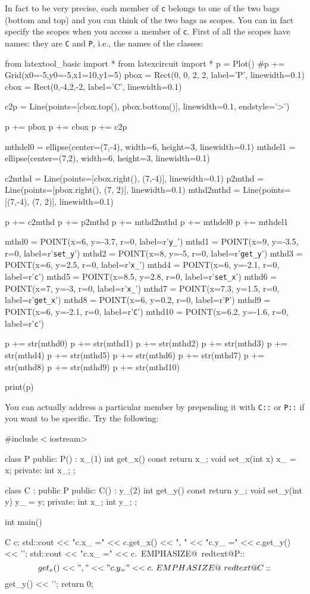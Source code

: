 In fact to be very precise, each member of \verb!c! belongs to one of
the two bags (bottom and top) and you can think of the two bags as
scopes. You can in fact specify the scopes when you access a member of
\verb!c!. First of all the scopes have names: they are \verb!C! and
\verb!P!, i.e., the names of the classes:
\begin{python}
from latextool_basic import *
from latexcircuit import *
p = Plot()
#p += Grid(x0=-5,y0=-5,x1=10,y1=5)
pbox = Rect(0, 0, 2, 2, label='P', linewidth=0.1)
cbox = Rect(0,-4,2,-2, label='C', linewidth=0.1)

c2p = Line(points=[cbox.top(), pbox.bottom()], linewidth=0.1, endstyle='>')

p += pbox
p += cbox
p += c2p

mthdel0 = ellipse(center=(7,-4), width=6, height=3, linewidth=0.1)
mthdel1 = ellipse(center=(7,2), width=6, height=3, linewidth=0.1)

c2mthd = Line(points=[cbox.right(), (7,-4)], linewidth=0.1)
p2mthd = Line(points=[pbox.right(), (7, 2)], linewidth=0.1)
mthd2mthd = Line(points=[(7,-4), (7, 2)], linewidth=0.1)

p += c2mthd
p += p2mthd
p += mthd2mthd
p += mthdel0
p += mthdel1

mthd0 = POINT(x=6, y=-3.7, r=0, label=r'\verb!y_!')
mthd1 = POINT(x=9, y=-3.5, r=0, label=r'\verb!set_y!')
mthd2 = POINT(x=8, y=-5, r=0, label=r'\verb!get_y!')
mthd3 = POINT(x=6, y=2.5, r=0, label=r'\verb!x_!')
mthd4 = POINT(x=6, y=-2.1, r=0, label=r'\large\verb!c!')
mthd5 = POINT(x=8.5, y=2.8, r=0, label=r'\verb!set_x!')
mthd6 = POINT(x=7, y=-3, r=0, label=r'\verb!x_!')
mthd7 = POINT(x=7.3, y=1.5, r=0, label=r'\verb!get_x!')
mthd8 = POINT(x=6, y=0.2, r=0, label=r'\large\verb!P!')
mthd9 = POINT(x=6, y=-2.1, r=0, label=r'\large\verb!C!')
mthd10 = POINT(x=6.2, y=-1.6, r=0, label=r'\large\verb!c!')

p += str(mthd0)
p += str(mthd1)
p += str(mthd2)
p += str(mthd3)
p += str(mthd4)
p += str(mthd5)
p += str(mthd6)
p += str(mthd7)
p += str(mthd8)
p += str(mthd9)
p += str(mthd10)

print(p)
\end{python}
You can actually address a particular member by prepending it with
\verb!C::! or \verb!P::! if you want to be specific. Try the following:
\begin{console}[commandchars=\~\@\$]
#include < iostream>

class P
{
public:
        P() : x_(1) {}
        int get_x() const { return x_; }
        void set_x(int x) { x_ = x; }
private:
        int x_;
};

class C : public P
{
public:
        C() : y_(2) {}
        int get_y() const { return y_; }
        void set_y(int y) { y_ = y; }
private:
        int x_;
        int y_;
};

int main()
{   
    C c;        
    std::cout << "c.x_ =" << c.get_x() << ", "
              << "c.y_ =" << c.get_y() << '\n';
    std::cout << "c.x_ =" << c.~EMPHASIZE@~redtext@P::$$get_x() << ", "
              << "c.y_ =" << c.~EMPHASIZE@~redtext@C::$$get_y() << '\n';
return 0;

}
\end{console}

